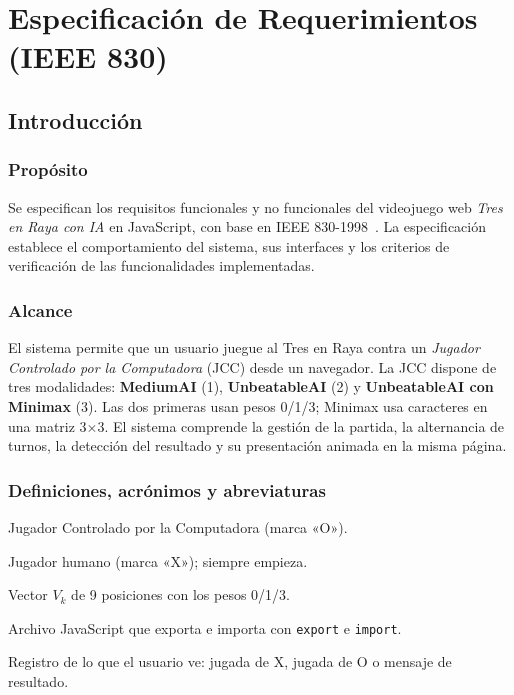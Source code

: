 \documentclass[12pt,a4paper]{article}
\begin{document}
\section{Especificación de Requerimientos (IEEE 830)}

\subsection{Introducción}

\subsubsection{Propósito}
Se especifican los requisitos funcionales y no funcionales del videojuego web
\emph{Tres en Raya con IA} en JavaScript, con base en IEEE 830-1998~\cite{ieee830}.
La especificación establece el comportamiento del sistema, sus interfaces y los
criterios de verificación de las funcionalidades implementadas.

\subsubsection{Alcance}
El sistema permite que un usuario juegue al Tres en Raya contra un
\emph{Jugador Controlado por la Computadora} (JCC) desde un navegador. La JCC
dispone de tres modalidades: \textbf{MediumAI} (1), \textbf{UnbeatableAI} (2) y
\textbf{UnbeatableAI con Minimax} (3). Las dos primeras usan pesos 0/1/3; Minimax
usa caracteres en una matriz 3$\times$3. El sistema comprende la gestión de la
partida, la alternancia de turnos, la detección del resultado y su presentación
animada en la misma página.

\subsubsection{Definiciones, acrónimos y abreviaturas}
\begin{description}[leftmargin=2.6cm,style=nextline]
  \item[JCC] Jugador Controlado por la Computadora (marca «O»).
  \item[Usuario] Jugador humano (marca «X»); siempre empieza.
  \item[mArrayMoves] Vector $V_k$ de 9 posiciones con los pesos 0/1/3.
  \item[Módulo ES] Archivo JavaScript que exporta e importa con \texttt{export} e \texttt{import}.
  \item[Evento] Registro de lo que el usuario ve: jugada de X, jugada de O o mensaje de resultado.
\end{description}
\end{document}
